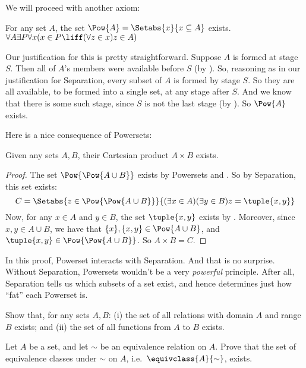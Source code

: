 \documentclass[../../../include/open-logic-section]{subfiles}
\begin{document}
\noindent
We will proceed with another axiom:
\begin{axiom*}[Powersets] For any set $A$, the set $\Pow{A} = \Setabs{x}{x \subseteq A}$ exists.\\
		$\forall A \exists P \forall x(x \in P \liff (\forall z \in x)z \in A)$
\end{axiom*}\noindent 
Our justification for this is pretty straightforward. Suppose $A$ is formed at stage $S$. Then all of $A$'s members were available before $S$ (by \stagesacc). So, reasoning as in our justification for Separation, every subset of $A$ is formed by stage $S$. So they are all available, to be formed into a single set, at any stage after $S$. And we know that there is some such stage, since $S$ is not the last stage (by \stagessucc). So $\Pow{A}$ exists.
	
Here is a nice consequence of Powersets:
\begin{prop}\label{thm:Products}
		Given any sets $A, B$, their Cartesian product $A \times B$ exists.
\end{prop}
\begin{proof}
	The set $\Pow{\Pow{A \cup B}}$ exists by Powersets and . So by Separation, this set exists:
		$$C = \Setabs{z \in \Pow{\Pow{A \cup B}}}{(\exists x \in A)(\exists y \in B) z = \tuple{x, y}}$$
	Now, for any $x \in A$ and $y \in B$, the set $\tuple{x, y}$ exists by . Moreover, since $x, y \in A \cup B$, we have that $\{x\}, \{x, y\} \in \Pow{A \cup B}$, and $\tuple{x,y} \in \Pow{\Pow{A \cup B}}$. So $A \times B = C$.
\end{proof}\noindent
	In this proof, Powerset interacts with Separation. And that is no surprise. Without Separation, Powersets wouldn't be a very \emph{powerful} principle. After all, Separation tells us which subsets of a set exist, and hence determines just how ``fat'' each Powerset is.  
	\begin{prob}
		Show that, for any sets $A, B$: (i) the set of all relations with domain $A$ and range $B$ exists; and (ii) the set of all functions from $A$ to $B$ exists.
	\end{prob}
	\begin{prob}
		Let $A$ be a set, and let $\sim$ be an equivalence relation on $A$. Prove that the set of equivalence classes under $\sim$ on $A$, i.e.\ $\equivclass{A}{\sim}$, exists.
	\end{prob}
\end{document}
